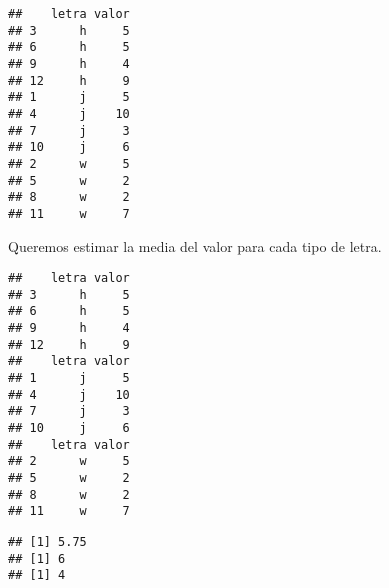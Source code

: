 \documentclass[]{article}
\newenvironment{Shaded}{\begin{snugshade}}{\end{snugshade}}
\newcommand{\KeywordTok}[1]{\textcolor[rgb]{0.13,0.29,0.53}{\textbf{{#1}}}}
\newcommand{\DataTypeTok}[1]{\textcolor[rgb]{0.13,0.29,0.53}{{#1}}}
\newcommand{\StringTok}[1]{\textcolor[rgb]{0.31,0.60,0.02}{{#1}}}
\newcommand{\CommentTok}[1]{\textcolor[rgb]{0.56,0.35,0.01}{\textit{{#1}}}}
\newcommand{\NormalTok}[1]{{#1}}
\begin{document}
\begin{verbatim}
##    letra valor
## 3      h     5
## 6      h     5
## 9      h     4
## 12     h     9
## 1      j     5
## 4      j    10
## 7      j     3
## 10     j     6
## 2      w     5
## 5      w     2
## 8      w     2
## 11     w     7
\end{verbatim}

Queremos estimar la media del valor para cada tipo de letra.

\begin{Shaded}
\end{Shaded}

\begin{verbatim}
##    letra valor
## 3      h     5
## 6      h     5
## 9      h     4
## 12     h     9
##    letra valor
## 1      j     5
## 4      j    10
## 7      j     3
## 10     j     6
##    letra valor
## 2      w     5
## 5      w     2
## 8      w     2
## 11     w     7
\end{verbatim}

\begin{Shaded}
\end{Shaded}

\begin{verbatim}
## [1] 5.75
## [1] 6
## [1] 4
\end{verbatim}

\begin{Shaded}
\end{Shaded}
\end{document}
